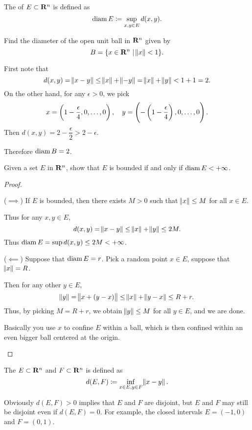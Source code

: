 \begin{definition}
The  of $E\subset\mathbf R^n$ is defined as
\[ \operatorname{diam} E\coloneqq\sup_{x,y\in E}d(x,y). \]
\end{definition}

\begin{exercise}
Find the diameter of the open unit ball in $\mathbf R^n$ given by
\[ B=\{x\in\mathbf R^n \mid \norm{x}<1\}. \]
\end{exercise}

\begin{solution}
First note that
\[ d(x,y)=\norm{x-y}\le\norm{x}+\norm{-y}=\norm{x}+\norm{y}<1+1=2. \]
On the other hand, for any $\epsilon>0$, we pick
\[ x=\left(1-\frac{\epsilon}{4},0,\dots,0\right), \quad y=\left(-\left(1-\frac{\epsilon}{4}\right),0,\dots,0\right). \]
Then $d(x,y)=2-\dfrac{\epsilon}{2}>2-\epsilon$.

Therefore $\operatorname{diam} B = 2$.
\end{solution}

\begin{exercise}
Given a set $E$ in $\mathbf R^n$, show that $E$ is bounded if and only if $\operatorname{diam} E<+\infty$.
\end{exercise}
\begin{proof} \

($\implies$) If $E$ is bounded, then there exists $M>0$ such that $\norm{x}\le M$ for all $x \in E$.

Thus for any $x,y \in E$,
\[ d(x,y)=\norm{x-y}\le\norm{x}+\norm{y}\le2M. \]
Thus $\operatorname{diam} E = \sup d(x,y) \le 2M<+\infty$.

($\impliedby$) Suppose that $\operatorname{diam} E=r$. Pick a random point $x \in E$, suppose that $\norm{x}=R$.

Then for any other $y \in E$,
\[ \norm{y}=\norm{x+(y-x)}\le\norm{x}+\norm{y-x}\le R+r. \]
Thus, by picking $M=R+r$, we obtain $\norm{y}\le M$ for all $y \in E$, and we are done.

\begin{remark}
Basically you use $x$ to confine $E$ within a ball, which is then confined within an even bigger ball centered at the origin.
\end{remark}
\end{proof}

\begin{definition}
The  $E\subset\mathbf R^n$ and $F\subset\mathbf R^n$ is defined as
\[ d(E,F)\coloneqq\inf_{x\in E,y\in F}\norm{x-y}. \]
\end{definition}

Obviously $d(E,F)>0$ implies that $E$ and $F$ are disjoint, but $E$ and $F$ may still be disjoint even if $d(E,F)=0$. For example, the closed intervals $E=(-1,0)$ and $F=(0,1)$.

